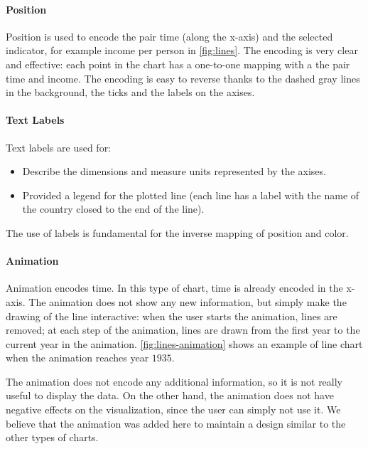 \paragraph{Position}
Position is used to encode the pair time (along the x-axis) and the selected indicator, for example income per person in \cref{fig:lines}.
The encoding is very clear and effective:
each point in the chart has a one-to-one mapping with a the pair time and income.
The encoding is easy to reverse thanks to the dashed gray lines in the background, the ticks and the labels on the axises.

\paragraph{Text Labels}
Text labels are used for:
\begin{itemize}
	\item Describe the dimensions and measure units represented by the axises.
	\item Provided a legend for the plotted line (each line has a label with the name of the country closed to the end of the line).
\end{itemize}
The use of labels is fundamental for the inverse mapping of position and color.

\paragraph{Animation}
Animation encodes time.
In this type of chart, time is already encoded in the x-axis.
The animation does not show any new information, but simply make the drawing of the line interactive:
when the user starts the animation, lines are removed;
at each step of the animation, lines are drawn from the first year to the current year in the animation.
\cref{fig:lines-animation} shows an example of line chart when the animation reaches year $1935$.

The animation does not encode any additional information, so it is not really useful to display the data.
On the other hand, the animation does not have negative effects on the visualization, since the user can simply not use it.
We believe that the animation was added here to maintain a design similar to the other types of charts.

